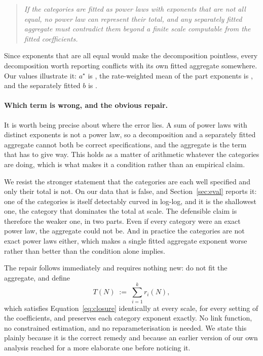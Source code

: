 \documentclass[11pt]{article}
\begin{document}
\begin{quote}
\emph{If the categories are fitted as power laws with exponents that are not all
equal, no power law can represent their total, and any separately fitted aggregate
must contradict them beyond a finite scale computable from the fitted coefficients.}
\end{quote}

Since exponents that are all equal would make the decomposition pointless, every
decomposition worth reporting conflicts with its own fitted aggregate somewhere. Our
values illustrate it: $a^\star$ is , the rate-weighted mean of the
part exponents is , and the separately fitted $b$ is
.

\paragraph{Which term is wrong, and the obvious repair.}
It is worth being precise about where the error lies. A sum of power laws with
distinct exponents is not a power law, so a decomposition and a separately fitted
aggregate cannot both be correct specifications, and the aggregate is the term that
has to give way. This holds as a matter of arithmetic whatever the categories are
doing, which is what makes it a condition rather than an empirical claim.

We resist the stronger statement that the categories are each well specified and
only their total is not. On our data that is false, and Section~\ref{sec:eval}
reports it: one of the  categories is itself detectably curved
in log-log, and it is the shallowest one, the category that dominates the total at
scale. The defensible claim is therefore the weaker one, in two parts. Even if every
category were an exact power law, the aggregate could not be. And in practice the
categories are not exact power laws either, which makes a single fitted aggregate
exponent worse rather than better than the condition alone implies.

The repair follows immediately and requires nothing new: do not fit the aggregate,
and define
\begin{equation}
T(N) \;:=\; \sum_{i=1}^{k} r_i(N),
\label{eq:derived}
\end{equation}
which satisfies Equation~\ref{eq:closure} identically at every scale, for every
setting of the coefficients, and preserves each category exponent exactly. No link
function, no constrained estimation, and no reparameterisation is needed. We state
this plainly because it is the correct remedy and because an earlier version of our
own analysis reached for a more elaborate one before noticing it.
\end{document}
